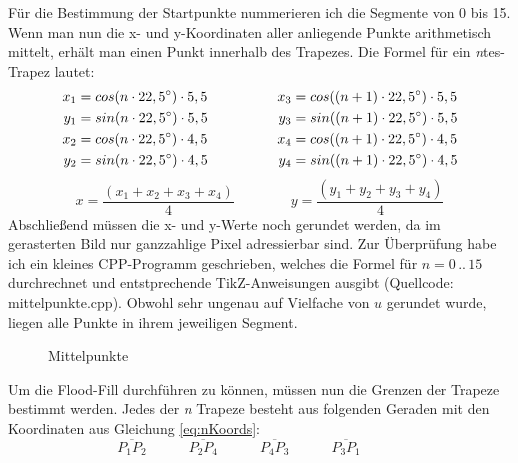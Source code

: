 	Für die Bestimmung der Startpunkte nummerieren ich die Segmente von 0 bis 15. Wenn man nun die x- und y-Koordinaten aller anliegende Punkte arithmetisch mittelt, erhält man einen Punkt innerhalb des Trapezes. Die Formel für ein \textit{n}tes-Trapez lautet:
	\begin{gather}
	\begin{split}
	x_1 &= cos(n \cdot 22,5^{\circ}) \cdot 5,5 \\
	y_1 &= sin(n \cdot 22,5^{\circ}) \cdot 5,5 \\ \vspace{2em}
	x_2 &= cos(n \cdot 22,5^{\circ}) \cdot 4,5 \\
	y_2 &= sin(n \cdot 22,5^{\circ}) \cdot 4,5
	\end{split}
	\hspace{5em}
	\begin{split}
	x_3 &= cos((n+1) \cdot 22,5^{\circ}) \cdot 5,5 \\
	y_3 &= sin((n+1) \cdot 22,5^{\circ}) \cdot 5,5 \\ \vspace{2em}
	x_4 &= cos((n+1) \cdot 22,5^{\circ}) \cdot 4,5 \\
	y_4 &= sin((n+1) \cdot 22,5^{\circ}) \cdot 4,5
	\end{split} \label{eq:nKoords}
	\end{gather}
	\begin{equation}
	x = \frac{(x_1+x_2+x_3+x_4)}{4} \hspace{4em} y = \frac{(y_1+y_2+y_3+y_4)}{4}
	\end{equation}
	Abschließend müssen die x- und y-Werte noch gerundet werden, da im gerasterten Bild nur ganzzahlige Pixel adressierbar sind.
	Zur Überprüfung habe ich ein kleines CPP-Programm geschrieben, welches die Formel für \(n = 0\hspace{2pt}..\hspace{2pt}15 \) durchrechnet und entstprechende TikZ-Anweisungen ausgibt (Quellcode: mittelpunkte.cpp). Obwohl sehr ungenau auf Vielfache von \(u\) gerundet wurde, liegen alle Punkte in ihrem jeweiligen Segment.
	\begin{figure}[!ht]
		\centering
		
		\caption{Mittelpunkte}
	\end{figure}

	Um die Flood-Fill durchführen zu können, müssen nun die Grenzen der Trapeze bestimmt werden. Jedes der \textit{n} Trapeze besteht aus folgenden Geraden mit den Koordinaten aus Gleichung \ref{eq:nKoords}:
	\begin{equation}
		\overline{P_1P_2} \hspace{3em}
		\overline{P_2P_4} \hspace{3em}
		\overline{P_4P_3} \hspace{3em}
		\overline{P_3P_1} \hspace{3em}
	\end{equation}

